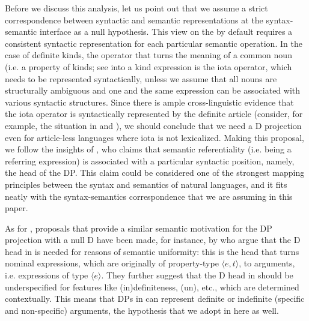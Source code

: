 \documentclass[output=paper
,modfonts
,nonflat]{langsci/langscibook}
\begin{document}
	Before we discuss this analysis, let us point out that we assume a strict correspondence between syntactic and semantic representations at the syntax\hyp{}semantic interface as a null hypothesis. This view on the  by default requires a consistent syntactic representation for each particular semantic operation. In the case of definite kinds, the operator that turns the meaning of a common noun (i.e. a property of kinds; see  into a kind expression is the iota operator, which needs to be represented syntactically, unless we assume that all nouns are structurally ambiguous and one and the same expression can be associated with various syntactic structures. Since there is ample cross-linguistic evidence that the iota operator is syntactically represented by the definite article (consider, for example, the situation in  and ), we should conclude that we need a D projection even for article-less languages where iota is not lexicalized. Making this proposal, we follow the insights of \citet{Longobardi1994, Longobardi2001, Longobardi2005}, who claims that semantic referentiality (i.e. being a referring expression) is associated with a particular syntactic position, namely, the head of the DP. This claim could be considered one of the strongest mapping principles between the syntax and semantics of natural languages, and it fits neatly with the syntax-semantics correspondence that we are assuming in this paper. 
	
	As for , proposals that provide a similar semantic motivation for the DP projection with a null D have been made, for instance, by \citet{Ramchand2008} who argue that the D head in  is needed for reasons of semantic uniformity: this is the head that turns nominal expressions, which are originally of property-type $\langle e,t\rangle$, to arguments, i.e. expressions of type $\langle e\rangle$. They further suggest that the D head in  should be underspecified for features like (in)definiteness, (un), etc., which are determined contextually. This means that DPs in  can represent definite or indefinite (specific and non-specific) arguments, the hypothesis that we adopt in here as well.
	
\end{document}
